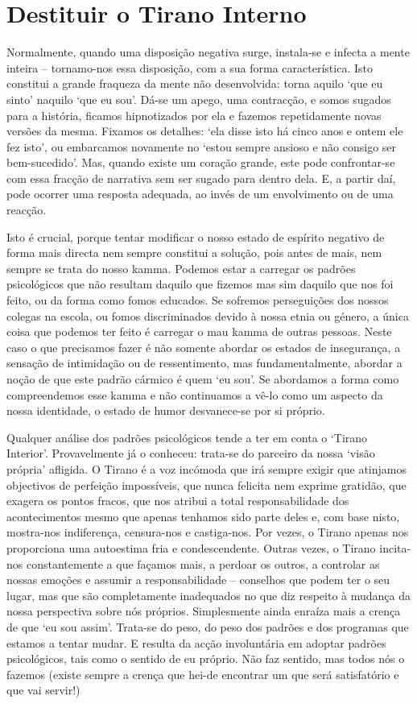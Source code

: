 \section{Destituir o Tirano Interno}

Normalmente, quando uma disposição negativa surge, instala-se e infecta a mente inteira -- tornamo-nos essa disposição, com a sua forma característica. Isto constitui a grande fraqueza da mente não desenvolvida: torna aquilo `que eu sinto' naquilo `que eu sou'. Dá-se um apego, uma contracção, e somos sugados para a história, ficamos hipnotizados por ela e fazemos repetidamente novas versões da mesma. Fixamos os detalhes: `ela disse isto há cinco anos e ontem ele fez isto', ou embarcamos novamente no `estou sempre ansioso e não consigo ser bem-sucedido'. Mas, quando existe um coração grande, este pode confrontar-se com essa fracção de narrativa sem ser sugado para dentro dela. E, a partir daí, pode ocorrer uma resposta adequada, ao invés de um envolvimento ou de uma reacção.

Isto é crucial, porque tentar modificar o nosso estado de espírito negativo de forma mais directa nem sempre constitui a solução, pois antes de mais, nem sempre se trata do nosso kamma. Podemos estar a carregar os padrões psicológicos que não resultam daquilo que fizemos mas sim daquilo que nos foi feito, ou da forma como fomos educados. Se sofremos perseguições dos nossos colegas na escola, ou fomos discriminados devido à nossa etnia ou género, a única coisa que podemos ter feito é carregar o mau kamma de outras pessoas. Neste caso o que precisamos fazer é não somente abordar os estados de insegurança, a sensação de intimidação ou de ressentimento, mas fundamentalmente, abordar a noção de que este padrão cármico é quem `eu sou'. Se abordamos a forma como compreendemos esse kamma e não continuamos a vê-lo como um aspecto da nossa identidade, o estado de humor desvanece-se por si próprio.

Qualquer análise dos padrões psicológicos tende a ter em conta o `Tirano Interior'. Provavelmente já o conheceu: trata-se do parceiro da nossa `visão própria' afligida. O Tirano é a voz incómoda que irá sempre exigir que atinjamos objectivos de perfeição impossíveis, que nunca felicita nem exprime gratidão, que exagera os pontos fracos, que nos atribui a total responsabilidade dos acontecimentos mesmo que apenas tenhamos sido parte deles e, com base nisto, mostra-nos indiferença, censura-nos e castiga-nos. Por vezes, o Tirano apenas nos proporciona uma autoestima fria e condescendente. Outras vezes, o Tirano incita-nos constantemente a que façamos mais, a perdoar os outros, a controlar as nossas emoções e assumir a responsabilidade -- conselhos que podem ter o seu lugar, mas que são completamente inadequados no que diz respeito à mudança da nossa perspectiva sobre nós próprios. Simplesmente ainda enraíza mais a crença de que `eu sou assim'. Trata-se do peso, do peso dos padrões e dos programas que estamos a tentar mudar. E resulta da acção involuntária em adoptar padrões psicológicos, tais como o sentido de eu próprio. Não faz sentido, mas todos nós o fazemos (existe sempre a crença que hei-de encontrar um que será satisfatório e que vai servir!)

